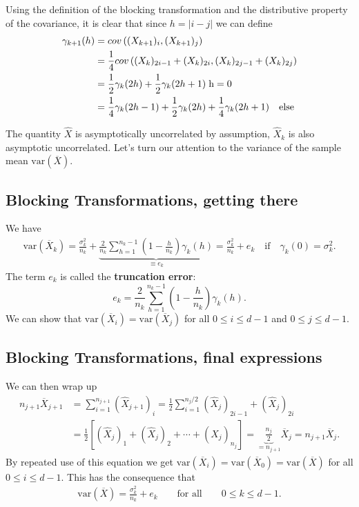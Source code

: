 \documentclass[%
oneside,                 %
final,                   %
10pt]{article}
\begin{document}
Using the
definition of the blocking transformation and the distributive
property of the covariance, it is clear that since $h =|i-j|$
we can define
\begin{align}
\gamma_{k+1}(h) &= cov\left( ({X}_{k+1})_{i}, ({X}_{k+1})_{j} \right) \nonumber \\
&=  \frac{1}{4}cov\left( ({X}_{k})_{2i-1} + ({X}_{k})_{2i}, ({X}_{k})_{2j-1} + ({X}_{k})_{2j} \right) \nonumber \\
&=  \frac{1}{2}\gamma_{k}(2h) + \frac{1}{2}\gamma_k(2h+1) \hspace{0.1cm} \mathrm{h = 0} \\
&=\frac{1}{4}\gamma_k(2h-1) + \frac{1}{2}\gamma_k(2h) + \frac{1}{4}\gamma_k(2h+1) \quad \mathrm{else}
\end{align}

The quantity $\hat{X}$ is asymptotically uncorrelated by assumption, $\hat{X}_k$ is also asymptotic uncorrelated. Let's turn our attention to the variance of the sample
mean $\mathrm{var}(\overline{X})$. 

\subsection{Blocking Transformations, getting there}
We have
\begin{align}
\mathrm{var}(\overline{X}_k) = \frac{\sigma_k^2}{n_k} + \underbrace{\frac{2}{n_k} \sum_{h=1}^{n_k-1}\left( 1 - \frac{h}{n_k} \right)\gamma_k(h)}_{\equiv e_k} = \frac{\sigma^2_k}{n_k} + e_k \quad \text{if} \quad \gamma_k(0) = \sigma_k^2. 
\end{align}
The term $e_k$ is called the \textbf{truncation error}: 
\begin{equation}
e_k = \frac{2}{n_k} \sum_{h=1}^{n_k-1}\left( 1 - \frac{h}{n_k} \right)\gamma_k(h). 
\end{equation}
We can show that $\mathrm{var}(\overline{X}_i) = \mathrm{var}(\overline{X}_j)$ for all $0 \leq i \leq d-1$ and $0 \leq j \leq d-1$. 

\subsection{Blocking Transformations, final expressions}

We can then wrap up
\begin{align}
n_{j+1} \overline{X}_{j+1}  &= \sum_{i=1}^{n_{j+1}} (\hat{X}_{j+1})_i =  \frac{1}{2}\sum_{i=1}^{n_{j}/2} (\hat{X}_{j})_{2i-1} + (\hat{X}_{j})_{2i} \nonumber \\
&= \frac{1}{2}\left[ (\hat{X}_j)_1 + (\hat{X}_j)_2 + \cdots + (\hat{X}_j)_{n_j} \right] = \underbrace{\frac{n_j}{2}}_{=n_{j+1}} \overline{X}_j = n_{j+1}\overline{X}_j. 
\end{align}
By repeated use of this equation we get $\mathrm{var}(\overline{X}_i) = \mathrm{var}(\overline{X}_0) = \mathrm{var}(\overline{X})$ for all $0 \leq i \leq d-1$. This has the consequence that
\begin{align}
\mathrm{var}(\overline{X}) = \frac{\sigma_k^2}{n_k} + e_k \qquad \text{for all} \qquad 0 \leq k \leq d-1. \label{eq:convergence}
\end{align}
\end{document}
